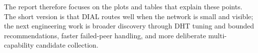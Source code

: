 The report therefore focuses on the plots and tables that explain these
points. The short version is that DIAL routes well when the network is small
and visible; the next engineering work is broader discovery through DHT tuning
and bounded recommendations, faster failed-peer handling, and more deliberate
multi-capability candidate collection.
